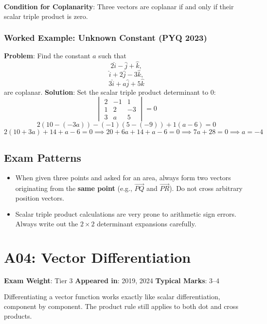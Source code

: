 \documentclass[
]{article}
\providecommand{\tightlist}{%
  \setlength{\itemsep}{0pt}\setlength{\parskip}{0pt}}
\renewenvironment{quote}
  {\begin{tcolorbox}[
     colback=calloutbg,
     colframe=calloutframe,
     colupper=callouttext,
     arc=3pt,
     boxrule=0.5pt,
     leftrule=0.5pt,
     borderline west={3pt}{0pt}{calloutaccent},
     left=8pt,
     right=8pt,
     top=6pt,
     bottom=6pt
   ]}
  {\end{tcolorbox}}
\begin{document}
\textbf{Condition for Coplanarity}: Three vectors are coplanar if and
only if their scalar triple product is zero.

\subsubsection{Worked Example: Unknown Constant (PYQ
2023)}\label{worked-example-unknown-constant-pyq-2023}

\textbf{Problem}: Find the constant \(a\) such that
\[
2\hat{i} - \hat{j} + \hat{k},
\]
\[
\hat{i} + 2\hat{j} - 3\hat{k},
\]
\[
3\hat{i} + a\hat{j} + 5\hat{k}
\]
are coplanar. \textbf{Solution}: Set the scalar triple product
determinant to 0:
\[
\begin{vmatrix}
2 & -1 & 1 \\
1 & 2 & -3 \\
3 & a & 5
\end{vmatrix} = 0
\]
\[
2(10 - (-3a)) - (-1)(5 - (-9)) + 1(a - 6) = 0
\]
\[
2(10 + 3a) + 14 + a - 6 = 0 \implies 20 + 6a + 14 + a - 6 = 0 \implies 7a + 28 = 0 \implies a = -4
\]

\subsection{Exam Patterns}\label{exam-patterns-2}

\begin{itemize}
\tightlist
\item
  When given three points and asked for an area, always form two vectors
  originating from the \textbf{same point} (e.g., \(\vec{PQ}\) and
  \(\vec{PR}\)). Do not cross arbitrary position vectors.
\item
  Scalar triple product calculations are very prone to arithmetic sign
  errors. Always write out the \(2 \times 2\) determinant expansions
  carefully.
\end{itemize}

\section{A04: Vector Differentiation}\label{a04-vector-differentiation}

\begin{quote}
\textbf{Exam Weight}: Tier 3 \textbar{} \textbf{Appeared in}: 2019, 2024
\textbar{} \textbf{Typical Marks}: 3--4
\end{quote}

Differentiating a vector function works exactly like scalar
differentiation, component by component. The product rule still applies
to both dot and cross products.
\end{document}
